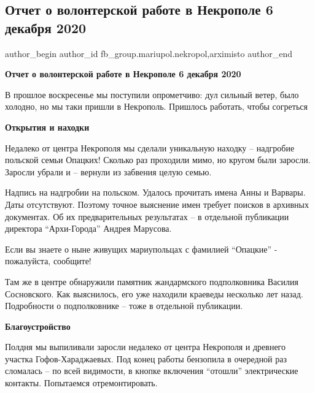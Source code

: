  
 
 
 
 

\subsection{Отчет о волонтерской работе в Некрополе 6 декабря 2020}
\label{sec:08_12_2020.fb.fb_group.mariupol.nekropol.1.otchet_volonter_rabota_6_dekabrja}
 
\ifcmt
 author_begin
   author_id fb_group.mariupol.nekropol,arximisto
 author_end
\fi

\textbf{Отчет о волонтерской работе в Некрополе 6 декабря 2020}

В прошлое воскресенье мы поступили опрометчиво: дул сильный ветер, было
холодно, но мы таки пришли в Некрополь. Пришлось работать, чтобы согреться 🙂

\textbf{Открытия и находки}

Недалеко от центра Некрополя мы сделали уникальную находку – надгробие польской
семьи Опацких! Сколько раз проходили мимо, но кругом были заросли. Заросли
убрали и – вернули из забвения целую семью.

Надпись на надгробии на польском. Удалось прочитать имена Анны и Варвары. Даты
отсутствуют. Поэтому точное выяснение имен требует поисков в архивных
документах. Об их предварительных результатах – в отдельной публикации
директора \enquote{Архи-Города} Андрея Марусова.

Если вы знаете о ныне живущих мариупольцах с фамилией \enquote{Опацкие} - пожалуйста,
сообщите!

Там же в центре обнаружили памятник жандармского подполковника Василия
Сосновского. Как выяснилось, его уже находили краеведы несколько лет назад.
Подробности о подполковнике – тоже в отдельной публикации.

\textbf{Благоустройство}

Полдня мы выпиливали заросли недалеко от центра Некрополя и древнего участка
Гофов-Хараджаевых. Под конец работы бензопила в очередной раз сломалась – по
всей видимости, в кнопке включения \enquote{отошли} электрические контакты. Попытаемся
отремонтировать.

